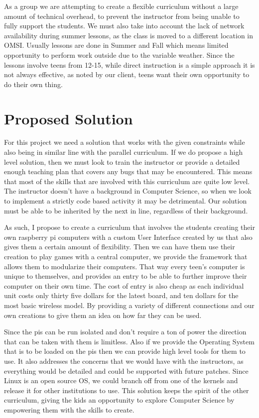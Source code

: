 \documentclass[10pt,a4paper,onecolumn,draftclsnofoot]{IEEEtran}
\begin{document}
As a group we are attempting to create a flexible curriculum without a large amount of technical overhead, to prevent the instructor from being unable to fully support the students. We must also take into account the lack of network availability during summer lessons, as the class is moved to a different location in OMSI. Usually lessons are done in Summer and Fall which means limited opportunity to perform work outside due to the variable weather. Since the lessons involve teens from 12-15, while direct instruction is a simple approach it is not always effective, as noted by our client, teens want their own opportunity to do their own thing.

\section*{Proposed Solution}
For this project we need a solution that works with the given constraints while also being in similar line with the parallel curriculum. If we do propose a high level solution, then we must look to train the instructor or provide a detailed enough teaching plan that covers any bugs that may be encountered. This means that most of the skills that are involved with this curriculum are quite low level. The instructor doesn't have a background in Computer Science, so when we look to implement a strictly code based activity it may be detrimental. Our solution must be able to be inherited by the next in line, regardless of their background.

As such, I propose to create a curriculum that involves the students creating their own raspberry pi computers with a custom User Interface created by us that also gives them a certain amount of flexibility. Then we can have them use their creation to play games with a central computer, we provide the framework that allows them to modularize their computers. That way every teen's computer is unique to themselves, and provides an entry to be able to further improve their computer on their own time. The cost of entry is also cheap as each individual unit costs only thirty five dollars for the latest board, and ten dollars for the most basic wireless model. By providing a variety of different connections and our own creations to give them an idea on how far they can be used. 

Since the pis can be run isolated and don't require a ton of power the direction that can be taken with them is limitless. Also if we provide the Operating System that is to be loaded on the pis then we can provide high level tools for them to use. It also addresses the concerns that we would have with the instructors, as everything would be detailed and could be supported with future patches. Since Linux is an open source OS, we could branch off from one of the kernels and release it for other institutions to use. This solution keeps the spirit of the other curriculum, giving the kids an opportunity to explore Computer Science by empowering them with the skills to create.
\end{document}
